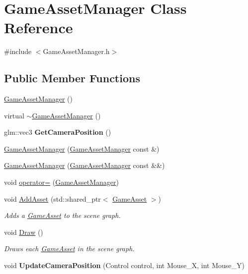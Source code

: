 \hypertarget{class_game_asset_manager}{}\section{Game\+Asset\+Manager Class Reference}
\label{class_game_asset_manager}


{\ttfamily \#include $<$Game\+Asset\+Manager.\+h$>$}

\subsection*{Public Member Functions}
\begin{DoxyCompactItemize}
\item 
\hyperlink{class_game_asset_manager_a84d0445928649e0d1e0f8e31ee137b17}{Game\+Asset\+Manager} ()
\item 
virtual \hyperlink{class_game_asset_manager_a1270bd61ecbcca563f079803e40c9b77}{$\sim$\+Game\+Asset\+Manager} ()
\item 
\hypertarget{class_game_asset_manager_a1d9f1f5cc6630a10a0bf358dc2bcddef}{}glm\+::vec3 {\bfseries Get\+Camera\+Position} ()\label{class_game_asset_manager_a1d9f1f5cc6630a10a0bf358dc2bcddef}

\item 
\hyperlink{class_game_asset_manager_a2c9adcb72faa154c87eadc9bafe5269d}{Game\+Asset\+Manager} (\hyperlink{class_game_asset_manager}{Game\+Asset\+Manager} const \&)
\item 
\hyperlink{class_game_asset_manager_a44f6e2fd6b8ff1dd64e5697f1be7386d}{Game\+Asset\+Manager} (\hyperlink{class_game_asset_manager}{Game\+Asset\+Manager} const \&\&)
\item 
void \hyperlink{class_game_asset_manager_a7c9e4fce50b47b78652e7ff0b4dbb629}{operator=} (\hyperlink{class_game_asset_manager}{Game\+Asset\+Manager})
\item 
\hypertarget{class_game_asset_manager_ad3de8ff00d55ba04728b1de8213b2349}{}void \hyperlink{class_game_asset_manager_ad3de8ff00d55ba04728b1de8213b2349}{Add\+Asset} (std\+::shared\+\_\+ptr$<$ \hyperlink{class_game_asset}{Game\+Asset} $>$)\label{class_game_asset_manager_ad3de8ff00d55ba04728b1de8213b2349}

\begin{DoxyCompactList}\small\item\em Adds a \hyperlink{class_game_asset}{Game\+Asset} to the scene graph. \end{DoxyCompactList}\item 
void \hyperlink{class_game_asset_manager_a32837132bd70a9a9ed537323c2d3d886}{Draw} ()
\begin{DoxyCompactList}\small\item\em Draws each \hyperlink{class_game_asset}{Game\+Asset} in the scene graph. \end{DoxyCompactList}\item 
\hypertarget{class_game_asset_manager_a459c51716179ef4b931f049be4aa69b4}{}void {\bfseries Update\+Camera\+Position} (Control control, int Mouse\+\_\+\+X, int Mouse\+\_\+\+Y)\label{class_game_asset_manager_a459c51716179ef4b931f049be4aa69b4}

\end{DoxyCompactItemize}


